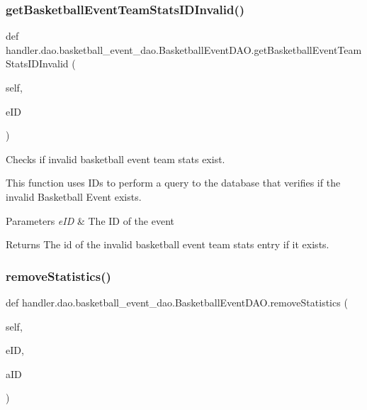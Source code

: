 \subsubsection{\texorpdfstring{get\+Basketball\+Event\+Team\+Stats\+I\+D\+Invalid()}{getBasketballEventTeamStatsIDInvalid()}}
{\footnotesize\ttfamily def handler.\+dao.\+basketball\+\_\+event\+\_\+dao.\+Basketball\+Event\+D\+A\+O.\+get\+Basketball\+Event\+Team\+Stats\+I\+D\+Invalid (\begin{DoxyParamCaption}\item[{}]{self,  }\item[{}]{e\+ID }\end{DoxyParamCaption})}



Checks if invalid basketball event team stats exist. 

This function uses I\+Ds to perform a query to the database that verifies if the invalid Basketball Event exists.


\begin{DoxyParams}{Parameters}
{\em e\+ID} & The ID of the event\\
\hline
\end{DoxyParams}
\begin{DoxyReturn}{Returns}
The id of the invalid basketball event team stats entry if it exists. 
\end{DoxyReturn}
\mbox{\label{classhandler_1_1dao_1_1basketball__event__dao_1_1_basketball_event_d_a_o_a174587db0a7e34ca1b475f21341a8244}} 
\subsubsection{\texorpdfstring{remove\+Statistics()}{removeStatistics()}}
{\footnotesize\ttfamily def handler.\+dao.\+basketball\+\_\+event\+\_\+dao.\+Basketball\+Event\+D\+A\+O.\+remove\+Statistics (\begin{DoxyParamCaption}\item[{}]{self,  }\item[{}]{e\+ID,  }\item[{}]{a\+ID }\end{DoxyParamCaption})}



